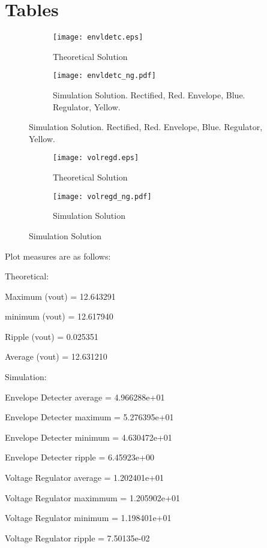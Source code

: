 \section{Tables}
\label{sec:tables}

\begin{figure}[H]
\centering
\caption{Plots from theoretical and simulation analysis}
\begin{subfigure}{\textwidth}
\centering
\texttt{[image: envldetc.eps]}
\caption{Theoretical Solution}
\end{subfigure}
\begin{subfigure}{\textwidth}
\centering
\texttt{[image: envldetc\_ng.pdf]}
\caption{Simulation Solution. Rectified, Red. Envelope, Blue. Regulator, Yellow.}
\end{subfigure}
\end{figure}

\begin{figure}[H]
\centering
\caption{Solution - 12}
\begin{subfigure}{\textwidth}
\centering
\texttt{[image: volregd.eps]}
\caption{Theoretical Solution}
\end{subfigure}
\begin{subfigure}{\textwidth}
\centering
\texttt{[image: volregd\_ng.pdf]}
\caption{Simulation Solution}
\end{subfigure}
\end{figure}

Plot measures are as follows: \par
Theoretical:\par

Maximum (vout) = 12.643291 \par
minimum (vout) = 12.617940 \par
Ripple (vout) = 0.025351 \par
Average (vout) = 12.631210\par

Simulation: \par

Envelope Detecter average =  4.966288e+01 \par
Envelope Detecter maximum =  5.276395e+01\par
Envelope Detecter minimum =  4.630472e+01\par
Envelope Detecter ripple =  6.45923e+00\par

Voltage Regulator average =  1.202401e+01\par
Voltage Regulator maximmum =  1.205902e+01\par
Voltage Regulator minimum =  1.198401e+01\par
Voltage Regulator ripple  =  7.50135e-02\par
